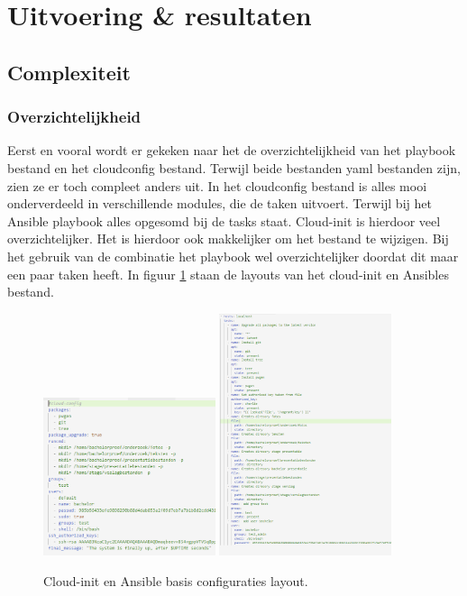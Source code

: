 \section{Uitvoering \& resultaten}
\subsection{Complexiteit}
\subsubsection{Overzichtelijkheid}
Eerst en vooral wordt er gekeken naar het de overzichtelijkheid van het playbook bestand en het cloudconfig bestand. Terwijl beide bestanden yaml bestanden zijn, zien ze er toch compleet anders uit. In het cloudconfig bestand is alles mooi onderverdeeld in verschillende modules, die de taken uitvoert. Terwijl bij het Ansible playbook alles opgesomd bij de tasks staat. Cloud-init is hierdoor veel overzichtelijker. Het is hierdoor ook makkelijker om het bestand te wijzigen. Bij het gebruik van de combinatie het playbook wel overzichtelijker doordat dit maar een paar taken heeft. In figuur \ref{fig:basisconf_layout} staan de layouts van het cloud-init en Ansibles bestand.
\begin{figure}[!htb]
    \centering
    {{\includegraphics[width=0.45\textwidth]{img/basiscloud.png} }}%
    \qquad
    {{\includegraphics[width=0.45\textwidth]{img/basisansible.png} }}%
    \caption{Cloud-init en Ansible basis configuraties layout.}%
    \label{fig:basisconf_layout}%
\end{figure}
